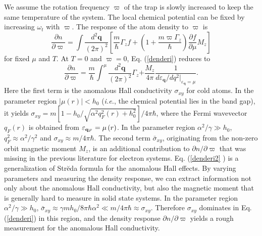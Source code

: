 \documentclass[pra,twocolumn,showpacs,floatfix]{revtex4-1}
\begin{document}
We assume the rotation frequency $\varpi $ of the trap is slowly increased
to keep the same temperature of the system. The local chemical potential can
be fixed by increasing $\omega _{t}$ with $\varpi $. The response of the
atom density to $\varpi $ is
\begin{equation}
\frac{\partial n}{\partial \varpi }=\int \frac{d^{2}\mathbf{q}}{\left( 2\pi
\right) ^{2}}\left[ \frac{m}{\hbar }\Gamma _{z}f+\left( 1+\frac{m\varpi
\Gamma _{z}}{\hbar }\right) \frac{\partial f}{\partial \mu }M_{z}\right]
\label{denderi}
\end{equation}%
for fixed $\mu $ and $T$. At $T=0$ and $\varpi =0$, Eq. (\ref{denderi})
reduces to%
\begin{equation}
\frac{\partial n}{\partial \varpi }=\frac{m}{\hbar }\int^{\mu }\frac{d^{2}%
\mathbf{q}}{\left( 2\pi \right) ^{2}}\Gamma _{z}\mathbf{+}\frac{M_{z}}{4\pi }%
\frac{1}{d\varepsilon _{\mathbf{q}}/dq^{2}|_{\varepsilon _{\mathbf{q}}=\mu }}%
.  \label{denderi2}
\end{equation}%
Here the first term is the anomalous Hall conductivity $\sigma _{xy}$ for
cold atoms. In the parameter region $\left\vert \mu \left( r\right)
\right\vert <h_{0}$ (\textit{i.e.}, the chemical potential lies in the band
gap), it yields $\sigma _{xy}=m\left[ 1-h_{0}/\sqrt{\alpha
^{2}q_{F}^{2}\left( r\right) +h_{0}^{2}}\right] /4\pi \hbar $, where the
Fermi wavevector $q_{F}\left( r\right) $ is obtained from $\varepsilon _{%
\mathbf{q}_{F}}=\mu \left( r\right) $. In the parameter region $\alpha
^{2}/\gamma \gg h_{0}$, $q_{F}^{2}\approx \alpha ^{2}/\gamma ^{2}$ and $%
\sigma _{xy}\approx m/4\pi \hbar $. The second term $\bar{\sigma}_{xy}$,
originating from the non-zero orbit magnetic moment $M_{z}$, is an
additional contribution to $\partial n/\partial \varpi $ that was missing in
the previous literature \cite{Xiao} for electron systems. Eq. (\ref{denderi2}%
) is a generalization of Str\u{e}da formula for the anomalous Hall effects.
By varying parameters and measuring the density response, we can extract
information not only about the anomalous Hall conductivity, but also the
magnetic moment that is generally hard to measure in solid state systems. In
the parameter region $\alpha ^{2}/\gamma \gg h_{0}$, $\bar{\sigma}%
_{xy}\approx \gamma mh_{0}/8\pi \hbar \alpha ^{2}\ll m/4\pi \hbar \approx
\sigma _{xy}$. Therefore $\sigma _{xy}$ dominates in Eq. (\ref{denderi}) in
this region, and the density response $\partial n/\partial \varpi $ yields a
rough measurement for the anomalous Hall conductivity. \newline
\end{document}
